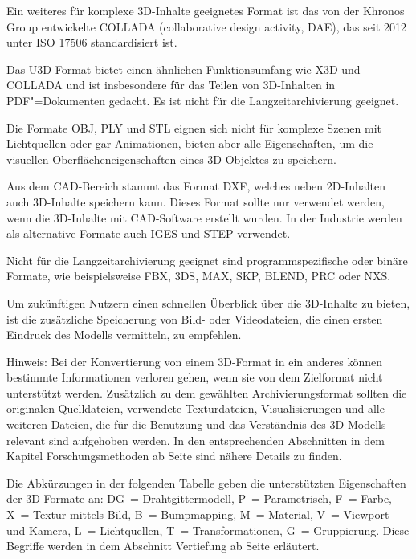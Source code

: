 Ein weiteres für komplexe 3D-Inhalte geeignetes Format ist das von der Khronos Group entwickelte COLLADA (collaborative design activity, DAE), das seit 2012 unter ISO 17506 standardisiert ist.

Das U3D-Format bietet einen ähnlichen Funktionsumfang wie X3D und COLLADA und ist insbesondere für das Teilen von 3D-Inhalten in PDF"=Dokumenten gedacht. Es ist nicht für die Langzeitarchivierung geeignet. 

Die Formate OBJ, PLY und STL eignen sich nicht für komplexe Szenen mit Lichtquellen oder gar Animationen, bieten aber alle Eigenschaften, um die visuellen Oberflächeneigenschaften eines 3D-Objektes zu speichern.

Aus dem CAD-Bereich stammt das Format DXF, welches neben 2D-Inhalten auch 3D-Inhalte speichern kann. Dieses Format sollte nur verwendet werden, wenn die 3D-Inhalte mit CAD-Software erstellt wurden. In der Industrie werden als alternative Formate auch IGES und STEP verwendet.

Nicht für die Langzeitarchivierung geeignet sind programmspezifische oder binäre Formate, wie beispielsweise FBX, 3DS, MAX, SKP, BLEND, PRC oder NXS.

Um zukünftigen Nutzern einen schnellen Überblick über die 3D-Inhalte zu bieten, ist die zusätzliche Speicherung von Bild- oder Videodateien, die einen ersten Eindruck des Modells vermitteln, zu empfehlen.

Hinweis: Bei der Konvertierung von einem 3D-Format in ein anderes können bestimmte Informationen verloren gehen, wenn sie von dem Zielformat nicht unterstützt werden. Zusätzlich zu dem gewählten Archivierungsformat sollten die originalen Quelldateien, verwendete Texturdateien, Visualisierungen und alle weiteren Dateien, die für die Benutzung und das Verständnis des 3D-Modells relevant sind aufgehoben werden. In den entsprechenden Abschnitten in dem Kapitel Forschungsmethoden ab Seite \pageref{methoden} sind nähere Details zu finden.

Die Abkürzungen in der folgenden Tabelle geben die unterstützten Eigenschaften der 3D-Formate an: DG~= Drahtgittermodell, P~= Parametrisch, F~= Farbe, X~= Textur mittels Bild, B~= Bumpmapping, M~= Material, V~= Viewport und Kamera, L~= Lichtquellen, T~= Transformationen, G~= Gruppierung. Diese Begriffe werden in dem Abschnitt Vertiefung ab Seite \pageref{3d:vertiefung} erläutert.

